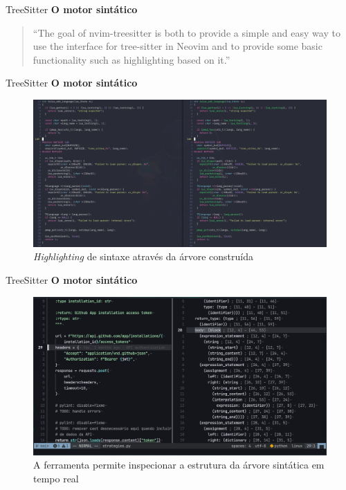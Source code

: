 \begin{frame}{TreeSitter}
  \textbf{O motor sintático}
    \begin{quotation} \small
      ``The goal of nvim-treesitter is both to provide a simple and easy way to use the interface for tree-sitter in
      Neovim and to provide some basic functionality such as highlighting based on it.''
    \end{quotation}
\end{frame}

\begin{frame}{TreeSitter}
  \textbf{O motor sintático}
  \begin{figure}
      \centering
      \includegraphics[height=0.5\linewidth]{Image/TreeSitter-Highlighting-Comparison.png}
      \label{treesitter-syntax-highlighting}
      \footnotesize
      \\ \textit{Highlighting} de sintaxe através da árvore construída\\
  \end{figure}
\end{frame}

\begin{frame}{TreeSitter}
  \textbf{O motor sintático}
  \begin{figure}
      \centering
      \includegraphics[height=0.5\linewidth]{Image/InspectTree.png}
      \label{treesitter-syntax-highlighting}
      \footnotesize
      \\ A ferramenta permite inspecionar a estrutura da árvore sintática em tempo real \\
  \end{figure}
\end{frame}

